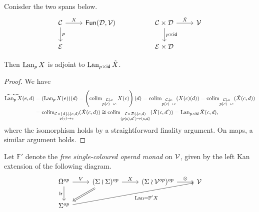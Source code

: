 \documentclass[psamsfonts,onesided,10pt
,draft
]{amsart}%
\begin{document}
\begin{lemma}
      \label{SPAN_LAN_LEM}
      Conisder the two spans below.
      \begin{equation}
            \begin{tikzcd}
                  \C \arrow[d, "p"] \arrow[r, "X"]
                  &
                  \mathsf{Fun}(\mathcal D, \V)
                  &&
                  \C \times \mathcal D \arrow[d, "p \times \mathsf{id}"] \arrow[r, "\tilde X"]
                  &
                  \V
                  \\
                  \mathcal E
                  &
                  &&
                  \mathcal E \times \mathcal D
            \end{tikzcd}
      \end{equation}
      
      Then $\operatorname{Lan}_p X$ is adjoint to $\operatorname{Lan}_{p \times \mathsf{id}} \tilde X$. 
\end{lemma}
\begin{proof}
      We have
      \begin{align}
        \widetilde{\operatorname{Lan}_p X}(e,d)
        &= (\operatorname{Lan}_p X(e))(d)
          = \left(
          \operatorname{colim}\limits_{\substack{ \mathcal{C} \downarrow e \\ p(c) \to e}} X(c)
        \right)(d)
        = \operatorname{colim}\limits_{\substack{ \mathcal{C} \downarrow e \\ p(c) \to e}}(X(c)(d))
        = \operatorname{colim}\limits_{\substack{ \mathcal{C} \downarrow e \\ p(c) \to e}}(\tilde X(c,d))\\
        &= \operatorname{colim}\limits_{\substack{ \mathcal{C} \times \left\{d\right\} \downarrow (e,d) \\ p(c) \to e}}(\tilde X(c,d))
        \cong \operatorname{colim}\limits_{\substack{ \mathcal{C} \times \mathcal D \downarrow (e,d) \\ (p(c),d') \to (e,d)}}(\tilde X(c,d'))
        = \operatorname{Lan}_{p \times \mathsf{id}}\tilde X(c,d),
      \end{align}
      where the isomorphism holds by a straightforward finality argument.
      On maps, a similar argument holds.
\end{proof}

\begin{notation}[\cite{BP17}]
      Let $\mathbb F'$ denote the \textit{free single-coloured operad monad} on $\mathcal V$, given by the left Kan extension of the following diagram.
      \begin{equation}
            \begin{tikzcd}
                  \Omega^{op}
                  \arrow[d, "\mathsf{lr}"']
                  \arrow[r, "V"]
                  &
                  (\Sigma \wr \Sigma)^{op} \arrow[r, "X"]
                  \arrow[dl, Rightarrow]
                  &
                  (\Sigma \wr \V^{op})^{op} \arrow[r, "\otimes"]
                  &
                  \V
                  \\
                  \Sigma^{op} \arrow[urrr, "\Lan = \mathbb F' X"']
            \end{tikzcd}
      \end{equation}
\end{notation}
\end{document}

